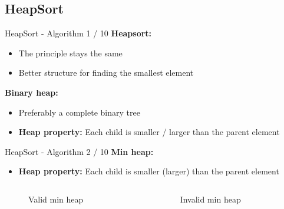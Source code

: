 \subsection{HeapSort}

\begin{frame}{HeapSort - Algorithm 1 / 10}
  \textbf{Heapsort:}
  \begin{itemize}
    \item
      The principle stays the same
    \item
      Better structure for finding the smallest element
  \end{itemize}
  \textbf{Binary heap:}
  \begin{itemize}
    \item
      Preferably a complete binary tree
    \item
      \textbf{Heap property:} Each child is smaller / larger than the parent
      element
  \end{itemize}
\end{frame}


\begin{frame}{HeapSort - Algorithm 2 / 10}
  \textbf{Min heap:}
  \begin{itemize}
    \item
      \textbf{Heap property:} Each child is {\color{Mittel-Blau}smaller}
      (larger) than the parent element
  \end{itemize}
  \begin{columns}
    \begin{column}{0.45\textwidth}
      \begin{figure}[!h]
        \begin{minipage}{\textwidth}
          
        \end{minipage}
        \caption{Valid min heap}
        \label{fig:minheap_valid}
      \end{figure}
    \end{column}%
    \hspace*{0.1em}%
    \begin{column}{0.45\textwidth}
      \begin{figure}[!h]
        \begin{minipage}{\textwidth}
          
        \end{minipage}
        \caption{Invalid min heap}
        \label{fig:minheap_invalid}
      \end{figure}
    \end{column}
  \end{columns}
\end{frame}

